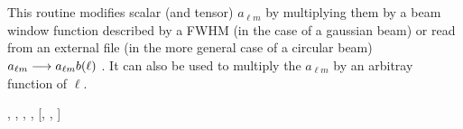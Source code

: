 
\sloppy


 \section[alter\_alm*]{ }
\label{sub:alter_alm}
\author{Eric Hivon}

\begin{facility}
{This routine modifies scalar (and tensor) $a_{\ell m}$ by multiplying them by a beam window
  function described by a FWHM (in the case of a gaussian beam) or read from an external
  file (in the more general case of a circular beam)  $a_{\ell m}
  \longrightarrow a_{\ell m} b(\ell)$ . It can also be used to
  multiply the  $a_{\ell m}$ by an arbitray function of $\ell$.}
{\modAlmTools}
\end{facility}

\begin{f90format}
{%
, %
, %
, %
, %
 [, %
, %
]}
\end{f90format}

